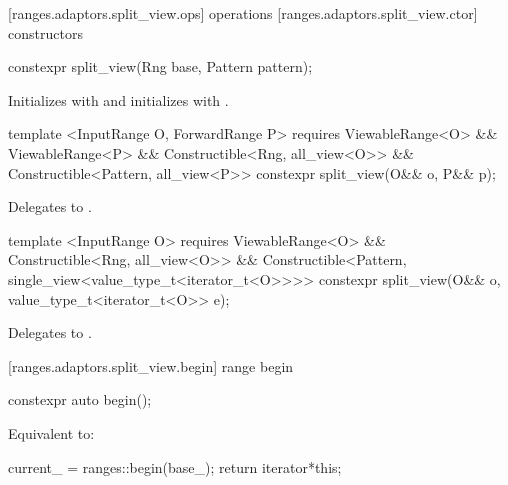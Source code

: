 [ranges.adaptors.split_view.ops]{ operations}
[ranges.adaptors.split_view.ctor]{ constructors}

%
\begin{itemdecl}
constexpr split_view(Rng base, Pattern pattern);
\end{itemdecl}

\begin{itemdescr}
\pnum
\effects Initializes  with  and initializes
 with .
\end{itemdescr}

%
\begin{itemdecl}
template <InputRange O, ForwardRange P>
  requires ViewableRange<O> && ViewableRange<P> &&
    Constructible<Rng, all_view<O>> &&
    Constructible<Pattern, all_view<P>>
constexpr split_view(O&& o, P&& p);
\end{itemdecl}

\begin{itemdescr}
\pnum
\effects Delegates to
.
\end{itemdescr}

%
\begin{itemdecl}
template <InputRange O>
  requires ViewableRange<O> &&
    Constructible<Rng, all_view<O>> &&
    Constructible<Pattern, single_view<value_type_t<iterator_t<O>>>>
constexpr split_view(O&& o, value_type_t<iterator_t<O>> e);
\end{itemdecl}

\begin{itemdescr}
\pnum
\effects Delegates to
.
\end{itemdescr}

[ranges.adaptors.split_view.begin]{ range begin}

%
\begin{itemdecl}
constexpr auto begin();
\end{itemdecl}

\begin{itemdescr}
\pnum
\effects Equivalent to:
\begin{codeblock}
current_ = ranges::begin(base_);
return iterator{*this};
\end{codeblock}
\end{itemdescr}

